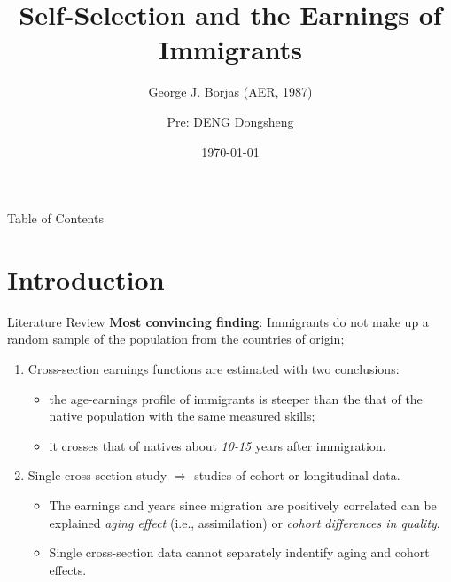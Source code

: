 \documentclass[10pt]{beamer}
\begin{document}
\title{Self-Selection and the Earnings of Immigrants}
\subtitle{George J. Borjas (AER, 1987)}
\author[Borjas (AER,1987)]{\small Pre: DENG Dongsheng}
\date{\today}

\begin{frame}[plain]
  \titlepage
\end{frame}


\begin{frame}{Table of Contents}
  \tableofcontents
\end{frame}


\section{Introduction}

\begin{frame}{Literature Review}
\textbf{Most convincing finding}: Immigrants do not make up a random sample of the population from the countries of origin;

\begin{enumerate}
    \item  Cross-section earnings functions are estimated with two conclusions:
    \begin{itemize}
        \item the age-earnings profile of immigrants is \alert{steeper} than the that of the native population with the same measured skills;
        \item it \alert{crosses} that of natives about \textit{10-15} years after immigration.
    \end{itemize}
    \item Single cross-section study $\Rightarrow$ studies of cohort or longitudinal data.
    \begin{itemize}
        \item The earnings and years since migration are positively correlated can be explained  \textit{aging effect} (i.e., assimilation) or \textit{cohort differences in quality}.
        \item Single cross-section data cannot separately indentify aging and cohort effects.
    \end{itemize}
\end{enumerate}

\end{frame}
\end{document}
